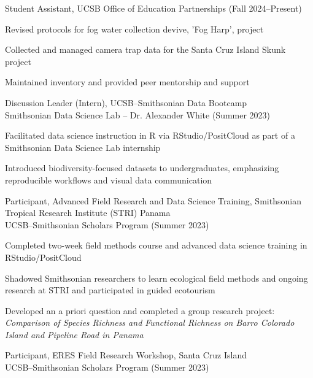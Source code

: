 \documentclass[letterpaper]{article}
\renewenvironment{itemize}{
  \begin{list}{}{
    \setlength{\leftmargin}{1.5em}
  }
}{
  \end{list}
}
\newenvironment{biblist}{%
   \begin{list}{}{%
     \setlength{\labelwidth}{0pt}%
     \setlength{\labelsep}{1em}%
     \setlength{\leftmargin}{2em}%
     \setlength{\itemindent}{-1em}%
   }
}{\end{list}}
\begin{document}
\begin{biblist}
\item Student Assistant, UCSB Office of Education Partnerships (Fall 2024–Present)  
\begin{itemize}
  \item Revised protocols for fog water collection devive, 'Fog Harp', project
  \item Collected and managed camera trap data for the Santa Cruz Island Skunk project
  \item Maintained inventory and provided peer mentorship and support
\end{itemize}

\item Discussion Leader (Intern), UCSB–Smithsonian Data Bootcamp \\
Smithsonian Data Science Lab – Dr. Alexander White (Summer 2023)  
\begin{itemize}
  \item Facilitated data science instruction in R via RStudio/PositCloud as part of a Smithsonian Data Science Lab internship
  \item Introduced biodiversity-focused datasets to undergraduates, emphasizing reproducible workflows and visual data communication
\end{itemize}

\item Participant, Advanced Field Research and Data Science Training, Smithsonian Tropical Research Institute (STRI) Panama \\
UCSB–Smithsonian Scholars Program (Summer 2023)  
\begin{itemize}
  \item Completed two-week field methods course and advanced data science training in RStudio/PositCloud
  \item Shadowed Smithsonian researchers to learn ecological field methods and ongoing research at STRI and participated in guided ecotourism
  \item Developed an a priori question and completed a group research project: \textit{Comparison of Species Richness and Functional Richness on Barro Colorado Island and Pipeline Road in Panama}
\end{itemize}

\item Participant, ERES Field Research Workshop, Santa Cruz Island \\
UCSB–Smithsonian Scholars Program (Summer 2023)
\end{biblist}
\end{document}
